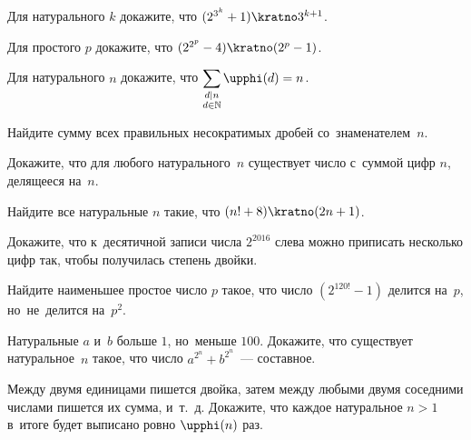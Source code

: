 \begin{problems}


\item
Для натурального $k$ докажите, что $(2^{3^k} + 1) \kratno 3^{k+1}$.

\item
Для простого $p$ докажите, что $(2^{2^p} - 4) \kratno (2^p - 1)$.

\item
Для натурального $n$ докажите, что\enspace
\(\displaystyle
    \sum_{\substack{
        d \divides n \\
        d \in \mathbb{N}
    }}
        \eulerphi(d)
=
    n
\).

\item
Найдите сумму всех правильных несократимых дробей со~знаменателем~$n$.

\item
Докажите, что для любого натурального~$n$ существует число с~суммой цифр $n$,
делящееся на~$n$.

\item
Найдите все натуральные $n$ такие, что $(n! + 8) \kratno (2 n + 1)$.

\item
Докажите, что к~десятичной записи числа $2^{2016}$ слева можно приписать
несколько цифр так, чтобы получилась степень двойки.

\item
Найдите наименьшее простое число $p$ такое, что число $(2^{120!} - 1)$ делится
на~$p$, но~не~делится на~$p^2$.

\item
Натуральные $a$ и~$b$ больше $1$, но~меньше $100$.
Докажите, что существует натуральное~$n$ такое, что число
$a^{2^n} + b^{2^n}$~--- составное.

\item
Между двумя единицами пишется двойка, затем между любыми двумя соседними
числами пишется их сумма, и~т.~д.
Докажите, что каждое натуральное $n > 1$ в~итоге будет выписано ровно
$\eulerphi(n)$ раз.

\end{problems}

\endgroup %

